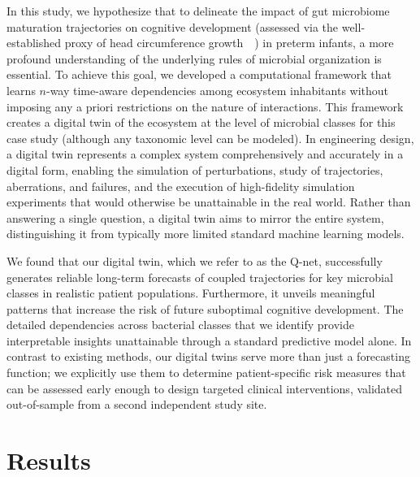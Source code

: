 \documentclass[onecolumn,10pt]{IEEEtran}
\def\qnet{Q-net\xspace}
\begin{document}
In this study, we hypothesize that to delineate the impact of gut microbiome maturation trajectories on   cognitive development (assessed via the well-established proxy of head circumference growth~\cite{raghuram2017head,kuban2009developmental,neubauer2016poor,cordova2020association,hack1991effect}~\cite{belfort2007infant,oliphant2021bacteroidota}) in preterm infants, a  more profound understanding of the underlying rules of microbial organization is essential. To achieve this goal, we developed a computational framework that learns $n$-way time-aware dependencies among ecosystem inhabitants without imposing any a priori restrictions on the nature of interactions. This framework creates a digital twin of the ecosystem at the level of microbial classes for this case study (although any taxonomic level can be modeled). In engineering design, a digital twin represents a complex system comprehensively and accurately in a digital form, enabling the simulation of perturbations, study of trajectories, aberrations, and failures, and the execution of high-fidelity simulation experiments that would otherwise be unattainable in the real world. Rather than answering a single question, a digital twin aims to mirror the entire system, distinguishing it from typically more limited standard  machine learning models.

We found that our digital twin, which we refer to as the \qnet, successfully generates reliable long-term forecasts of coupled trajectories for key microbial classes in realistic patient populations. Furthermore, it unveils meaningful patterns that increase the risk of future suboptimal cognitive development. The detailed dependencies across bacterial classes that we identify provide interpretable insights unattainable through a standard predictive model alone. In contrast to existing methods, our digital twins serve more than just a forecasting function; we explicitly use them to determine patient-specific risk measures that can be assessed early enough to design targeted clinical interventions, validated out-of-sample from a second independent study site.


\section*{Results} 
\end{document}
